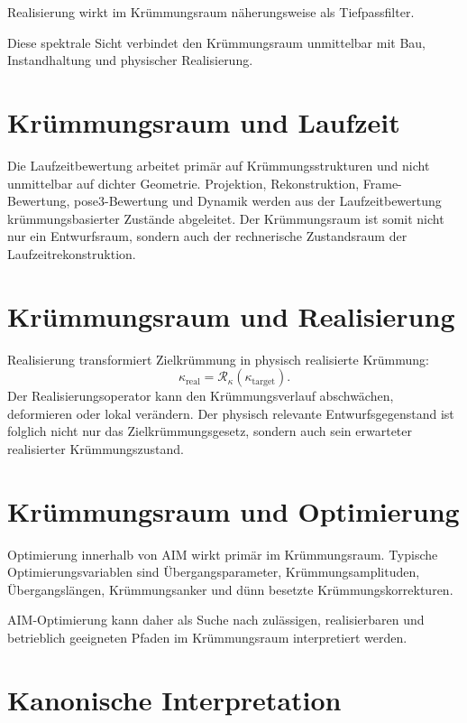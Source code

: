 \begin{proposition}
\label{prop:spectral-realization-principle}
Realisierung wirkt im Krümmungsraum näherungsweise als Tiefpassfilter.
\end{proposition}

Diese spektrale Sicht verbindet den Krümmungsraum unmittelbar mit Bau,
Instandhaltung und physischer Realisierung.

\section{Krümmungsraum und Laufzeit}

Die Laufzeitbewertung arbeitet primär auf Krümmungsstrukturen und nicht
unmittelbar auf dichter Geometrie. Projektion, Rekonstruktion,
Frame-Bewertung, pose3-Bewertung und Dynamik werden aus der Laufzeitbewertung
krümmungsbasierter Zustände abgeleitet. Der Krümmungsraum ist somit nicht nur
ein Entwurfsraum, sondern auch der rechnerische Zustandsraum der
Laufzeitrekonstruktion.

\section{Krümmungsraum und Realisierung}

Realisierung transformiert Zielkrümmung in physisch realisierte Krümmung:
\[
\kappa_{\mathrm{real}}
=
\mathcal R_{\kappa}(\kappa_{\mathrm{target}}).
\]
Der Realisierungsoperator kann den Krümmungsverlauf abschwächen, deformieren
oder lokal verändern. Der physisch relevante Entwurfsgegenstand ist folglich
nicht nur das Zielkrümmungsgesetz, sondern auch sein erwarteter realisierter
Krümmungszustand.

\section{Krümmungsraum und Optimierung}

Optimierung innerhalb von AIM wirkt primär im Krümmungsraum. Typische
Optimierungsvariablen sind Übergangsparameter, Krümmungsamplituden,
Übergangslängen, Krümmungsanker und dünn besetzte Krümmungskorrekturen.

AIM-Optimierung kann daher als Suche nach zulässigen, realisierbaren und
betrieblich geeigneten Pfaden im Krümmungsraum interpretiert werden.

\section{Kanonische Interpretation}


